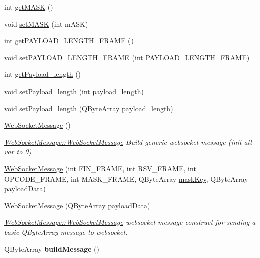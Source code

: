 \begin{DoxyCompactItemize}
\item 
int \hyperlink{class_web_socket_message_a5a195e4214714da35675241e53adf4b1}{get\-M\-A\-S\-K} ()
\item 
void \hyperlink{class_web_socket_message_a86665cec5c41a40e69cb9c9ff410e55c}{set\-M\-A\-S\-K} (int m\-A\-S\-K)
\item 
int \hyperlink{class_web_socket_message_a11526a5b971c4e03f68d559dab24abce}{get\-P\-A\-Y\-L\-O\-A\-D\-\_\-\-L\-E\-N\-G\-T\-H\-\_\-\-F\-R\-A\-M\-E} ()
\item 
void \hyperlink{class_web_socket_message_ad1c1498aef9222738d226167c09aa720}{set\-P\-A\-Y\-L\-O\-A\-D\-\_\-\-L\-E\-N\-G\-T\-H\-\_\-\-F\-R\-A\-M\-E} (int P\-A\-Y\-L\-O\-A\-D\-\_\-\-L\-E\-N\-G\-T\-H\-\_\-\-F\-R\-A\-M\-E)
\item 
int \hyperlink{class_web_socket_message_af59f5ae1d0f90c445cfb5eaacaa81c54}{get\-Payload\-\_\-length} ()
\item 
void \hyperlink{class_web_socket_message_ab92f2e6a5d18d13e418a55d6d00b6e4e}{set\-Payload\-\_\-length} (int payload\-\_\-length)
\item 
void \hyperlink{class_web_socket_message_a012f75a8ae98d53134c9d69a636a1852}{set\-Payload\-\_\-length} (Q\-Byte\-Array payload\-\_\-length)
\item 
\hypertarget{class_web_socket_message_a9ccef692ce81b78f9cabafb2ff0db849}{\hyperlink{class_web_socket_message_a9ccef692ce81b78f9cabafb2ff0db849}{Web\-Socket\-Message} ()}\label{class_web_socket_message_a9ccef692ce81b78f9cabafb2ff0db849}

\begin{DoxyCompactList}\small\item\em \hyperlink{class_web_socket_message_a9ccef692ce81b78f9cabafb2ff0db849}{Web\-Socket\-Message\-::\-Web\-Socket\-Message} Build generic websocket message (init all var to 0) \end{DoxyCompactList}\item 
\hyperlink{class_web_socket_message_aa0b68263ff13e67f0d4725eea7b72dd1}{Web\-Socket\-Message} (int F\-I\-N\-\_\-\-F\-R\-A\-M\-E, int R\-S\-V\-\_\-\-F\-R\-A\-M\-E, int O\-P\-C\-O\-D\-E\-\_\-\-F\-R\-A\-M\-E, int M\-A\-S\-K\-\_\-\-F\-R\-A\-M\-E, Q\-Byte\-Array \hyperlink{class_web_socket_message_a0b0651e073c2998a609434e84fdb771d}{mask\-Key}, Q\-Byte\-Array \hyperlink{class_web_socket_message_a99b2d16c9a26451b2655f7959ba8b4a1}{payload\-Data})
\item 
\hyperlink{class_web_socket_message_ac4cb680a33387642b10929d3746c8768}{Web\-Socket\-Message} (Q\-Byte\-Array \hyperlink{class_web_socket_message_a99b2d16c9a26451b2655f7959ba8b4a1}{payload\-Data})
\begin{DoxyCompactList}\small\item\em \hyperlink{class_web_socket_message_a9ccef692ce81b78f9cabafb2ff0db849}{Web\-Socket\-Message\-::\-Web\-Socket\-Message} websocket message construct for sending a basic Q\-Byte\-Array message to websocket. \end{DoxyCompactList}\item 
\hypertarget{class_web_socket_message_a8c27322a68b20d519f01a08f16fc46ef}{Q\-Byte\-Array {\bfseries build\-Message} ()}\label{class_web_socket_message_a8c27322a68b20d519f01a08f16fc46ef}


\end{DoxyCompactItemize}
